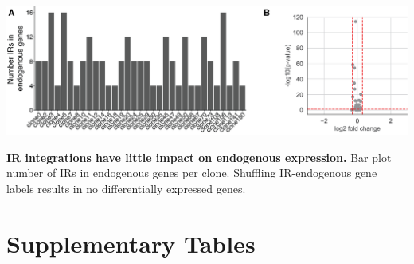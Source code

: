 \begin{suppfigure}[p]  
    \centering
    \includegraphics[width=\linewidth]{figures/cas/cas_suppfigure6.png}
    \caption[IR integrations have little impact on endogenous expression.]{
        \textbf{IR integrations have little impact on endogenous expression.}
        Bar plot number of IRs in endogenous genes per clone.
        Shuffling IR-endogenous gene labels results in no differentially expressed genes.   
    }
    \label{fig:cas_figureS6}
\end{suppfigure}

\clearpage
\section{Supplementary Tables}

